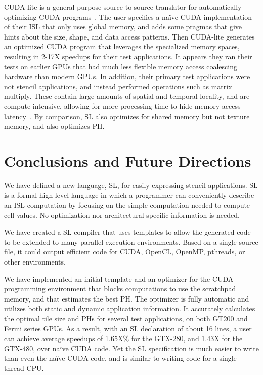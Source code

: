 \documentclass[preprint,nocopyrightspace]{styles/sigplanconf}
\begin{document}
CUDA-lite is a general purpose source-to-source translator for automatically
optimizing CUDA programs~\cite{cudalite}.  The user specifies a na\"{i}ve CUDA
implementation of their ISL that only uses global memory, and adds some pragmas
that give hints about the size, shape, and data access patterns.  Then
CUDA-lite generates an optimized CUDA program that leverages the
specialized memory spaces, resulting in 2-17X speedups for their test
applications.  It appears they ran their tests on earlier GPUs that had much
less flexible memory access coalescing hardware than modern GPUs.  In addition,
their primary test applications were not stencil applications, and instead
performed operations such as matrix multiply. These contain large amounts of
spatial and temporal locality, and are compute intensive, allowing for more
processing time to hide memory access latency~\cite{Ryoo}. By comparison, SL
also optimizes for shared memory but not texture memory, and also
optimizes PH.

\section{Conclusions and Future Directions}

We have defined a new language, SL, for easily expressing stencil applications.
SL is a formal high-level language in which a programmer can conveniently
describe an ISL computation by focusing on the simple computation needed to
compute cell values.  No optimization nor architectural-specific information is
needed.

We have created a SL compiler that uses templates to allow the generated code
to be extended to many parallel execution environments.  Based on a single
source file, it could output efficient code for CUDA, OpenCL, OpenMP, pthreads,
or other environments.

We have implemented an initial template and an optimizer for the CUDA
programming environment that blocks computations to use the scratchpad memory,
and that estimates the best PH.  The optimizer is fully automatic and utilizes
both static and dynamic application information.  It accurately
calculates the optimal tile size and PHs for several test applications, on both
GT200 and Fermi series GPUs.  As a result, with an SL declaration of
about 16 lines, a user can achieve average speedups of 1.65X\% for
the GTX-280, and 1.43X for the GTX-480, over na\"{i}ve CUDA code.
Yet the SL specification is much easier to write than even the
na\"{i}ve CUDA code, and is similar to writing code for a single
thread CPU.
\end{document}
